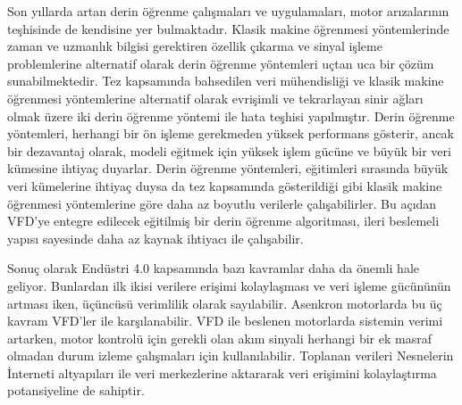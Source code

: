 Son yıllarda artan derin öğrenme çalışmaları ve uygulamaları, motor arızalarının teşhisinde de kendisine yer bulmaktadır. Klasik makine öğrenmesi yöntemlerinde zaman ve uzmanlık bilgisi gerektiren özellik çıkarma ve sinyal işleme problemlerine alternatif olarak derin öğrenme yöntemleri uçtan uca bir çözüm sunabilmektedir. Tez kapsamında bahsedilen veri mühendisliği ve klasik makine öğrenmesi yöntemlerine alternatif olarak evrişimli ve tekrarlayan sinir ağları olmak üzere iki derin öğrenme yöntemi ile hata teşhisi yapılmıştır. Derin öğrenme yöntemleri, herhangi bir ön işleme gerekmeden yüksek performans gösterir, ancak bir dezavantaj olarak, modeli eğitmek için yüksek işlem gücüne ve büyük bir veri kümesine ihtiyaç duyarlar. Derin öğrenme yöntemleri, eğitimleri sırasında büyük veri kümelerine ihtiyaç duysa da tez kapsamında gösterildiği gibi klasik makine öğrenmesi yöntemlerine göre daha az boyutlu verilerle çalışabilirler. Bu açıdan VFD'ye entegre edilecek eğitilmiş bir derin öğrenme algoritması, ileri beslemeli yapısı sayesinde daha az kaynak ihtiyacı ile çalışabilir.

Sonuç olarak Endüstri 4.0 kapsamında bazı kavramlar daha da önemli hale geliyor. Bunlardan ilk ikisi verilere erişimi kolaylaşması ve veri işleme gücününün artması iken, üçüncüsü verimlilik olarak sayılabilir. Asenkron motorlarda bu üç kavram VFD'ler ile karşılanabilir. VFD ile beslenen motorlarda sistemin verimi artarken, motor kontrolü için gerekli olan akım sinyali herhangi bir ek masraf olmadan durum izleme çalışmaları için kullanılabilir. Toplanan verileri Nesnelerin İnterneti altyapıları ile veri merkezlerine aktararak veri erişimini kolaylaştırma potansiyeline de sahiptir.
 
